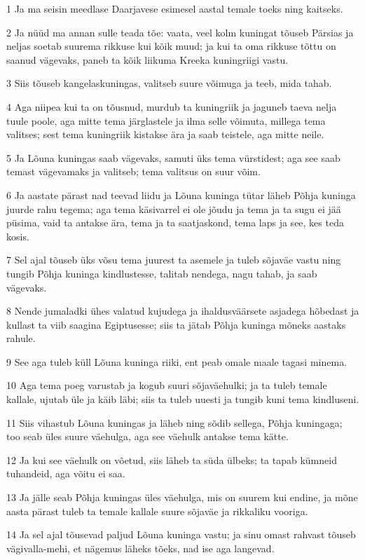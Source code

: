 \par 1 Ja ma seisin meedlase Daarjavese esimesel aastal temale toeks ning kaitseks.
\par 2 Ja nüüd ma annan sulle teada tõe: vaata, veel kolm kuningat tõuseb Pärsias ja neljas soetab suurema rikkuse kui kõik muud; ja kui ta oma rikkuse tõttu on saanud vägevaks, paneb ta kõik liikuma Kreeka kuningriigi vastu.
\par 3 Siis tõuseb kangelaskuningas, valitseb suure võimuga ja teeb, mida tahab.
\par 4 Aga niipea kui ta on tõusnud, murdub ta kuningriik ja jaguneb taeva nelja tuule poole, aga mitte tema järglastele ja ilma selle võimuta, millega tema valitses; sest tema kuningriik kistakse ära ja saab teistele, aga mitte neile.
\par 5 Ja Lõuna kuningas saab vägevaks, samuti üks tema vürstidest; aga see saab temast vägevamaks ja valitseb; tema valitsus on suur võim.
\par 6 Ja aastate pärast nad teevad liidu ja Lõuna kuninga tütar läheb Põhja kuninga juurde rahu tegema; aga tema käsivarrel ei ole jõudu ja tema ja ta sugu ei jää püsima, vaid ta antakse ära, tema ja ta saatjaskond, tema laps ja see, kes teda kosis.
\par 7 Sel ajal tõuseb üks võsu tema juurest ta asemele ja tuleb sõjaväe vastu ning tungib Põhja kuninga kindlustesse, talitab nendega, nagu tahab, ja saab vägevaks.
\par 8 Nende jumaladki ühes valatud kujudega ja ihaldusväärsete asjadega hõbedast ja kullast ta viib saagina Egiptusesse; siis ta jätab Põhja kuninga mõneks aastaks rahule.
\par 9 See aga tuleb küll Lõuna kuninga riiki, ent peab omale maale tagasi minema.
\par 10 Aga tema poeg varustab ja kogub suuri sõjaväehulki; ja ta tuleb temale kallale, ujutab üle ja käib läbi; siis ta tuleb uuesti ja tungib kuni tema kindluseni.
\par 11 Siis vihastub Lõuna kuningas ja läheb ning sõdib sellega, Põhja kuningaga; too seab üles suure väehulga, aga see väehulk antakse tema kätte.
\par 12 Ja kui see väehulk on võetud, siis läheb ta süda ülbeks; ta tapab kümneid tuhandeid, aga võitu ei saa.
\par 13 Ja jälle seab Põhja kuningas üles väehulga, mis on suurem kui endine, ja mõne aasta pärast tuleb ta temale kallale suure sõjaväe ja rikkaliku vooriga.
\par 14 Ja sel ajal tõusevad paljud Lõuna kuninga vastu; ja sinu omast rahvast tõuseb vägivalla-mehi, et nägemus läheks tõeks, nad ise aga langevad.
